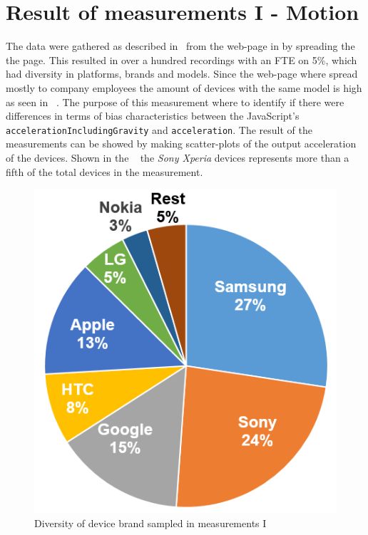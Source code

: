 \section{Result of measurements I  - Motion}\label{res:testI}
The data were gathered as described in~ from the web-page in  by spreading the the page. This resulted in over a hundred recordings with an FTE on 5\%, which had diversity in platforms, brands and models. Since the web-page where spread mostly to company employees the amount of devices with the same model is high as seen in ~.
The purpose of this measurement where to identify if there were differences in terms of bias characteristics between the JavaScript's \texttt{accelerationIncludingGravity} and \texttt{acceleration}. The result of the measurements can be showed by making scatter-plots of the output acceleration of the devices. Shown in the ~ the \textit{Sony Xperia} devices represents more than a fifth of the total devices in the measurement. 
\begin{figure}[h]
	\centering
	\includegraphics[scale=0.3]{img/measure1-brand}
	\caption{Diversity of device brand sampled in measurements I}
	\label{fig:measure1-brand}
\end{figure}
